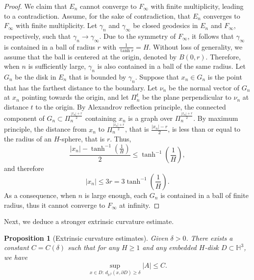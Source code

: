 \documentclass[12pt,a4paper]{amsart}
\numberwithin{equation}{section}
\theoremstyle{plain}
\newtheorem{Prop}[Th]{Proposition}
\theoremstyle{named}
\theoremstyle{definition}
\begin{document}
\begin{proof}
We claim that $E_n$ cannot converge to $F_\infty$ with finite multiplicity, leading to a contradiction. 
Assume, for the sake of contradiction, that $E_n$ converges to $F_\infty$ with finite multiplicity. Let $\gamma_n$ and $\gamma_\infty$ be closed geodesics in $E_n$ and $F_\infty$, respectively, such that $\gamma_n\rightarrow \gamma_\infty$. Due to the symmetry of $F_\infty$, it follows that $\gamma_\infty$ is contained in a ball of radius $r$ with $\frac{1}{\tanh r}=H$. Without loss of generality, we assume that the ball is centered at the origin, denoted by $B(0,r)$. Therefore, when $n$ is sufficiently large, $\gamma_n$ is also contained in a ball of the same radius. Let $G_n$ be the disk in $E_n$ that is bounded by $\gamma_n$. Suppose that $x_n\in G_n$ is the point that has the farthest distance to the boundary. Let $\nu_n$ be the normal vector of $G_n$ at $x_n$ pointing towards the origin, and let $\Pi_n^t$ be the plane perpendicular to $\nu_n$ at distance $t$ to the origin. By Alexandrov reflection principle, the connected component of $G_n\subset \Pi_n^{\frac{|x_n|+r}{2}}$ containing $x_n$ is a graph over $\Pi_n^{\frac{|x_n|+r}{2}}$. By maximum principle, the distance from $x_n$ to $\Pi_n^{\frac{|x_n|+r}{2}}$, that is $\frac{|x_n|-r}{2}$, is less than or equal to the radius of an $H$-sphere, that is $r$. Thus, \begin{equation*}
    \frac{|x_n|-\tanh^{-1}\left(\frac{1}{H}\right)}{2}\leq \tanh^{-1}\left(\frac{1}{H}\right),
\end{equation*}
and therefore \begin{equation*}
    |x_n|\leq 3r=3\tanh^{-1}\left(\frac{1}{H}\right).
\end{equation*}
As a consequence, when $n$ is large enough, each $G_n$ is contained in a ball of finite radius, thus it cannot converge to $F_\infty$ at infinity.    
\end{proof}



Next, we deduce a stronger extrinsic curvature estimate. 

\begin{Prop}[Extrinsic curvature estimates]\label{prop_extrinsic curv} 
Given $\delta>0$. There exists a constant $C=C(\delta)$ such that for any $H\geq 1$ and any embedded $H$-disk $D\subset\mathbb{H}^3$,
   we have \begin{equation*}
       \sup_{x\in D: \,d_{\mathbb{H}^3}(x,\partial D)\geq \delta}|A|\leq C.
   \end{equation*}
\end{Prop}
\end{document}
